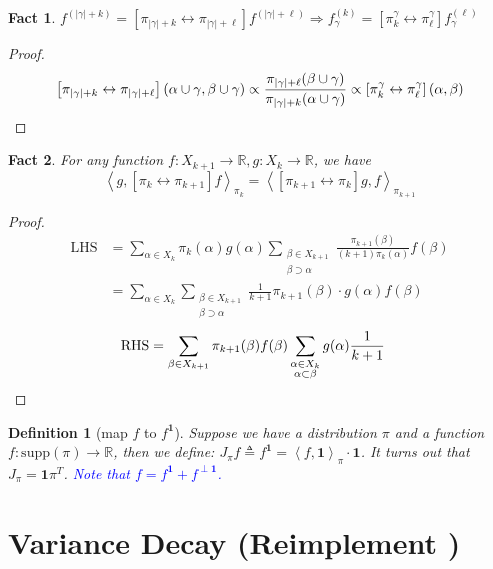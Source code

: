 \documentclass{article}
\newtheorem{define}{Definition}[section]
\newtheorem{fact}{Fact}[section]
\def\Op#1#2{\left[#1 \leftrightarrow #2\right]}
\def\<{\left\langle}
\def\>{\right\rangle}
\begin{document}
\begin{fact}\label{fact:f-consistent}
  $f^{(|\gamma|+k)} = \Op{\pi_{|\gamma|+k}}{\pi_{|\gamma|+\ell}} f^{(|\gamma| + \ell)} \Rightarrow f^{(k)}_\gamma = \Op{\pi^\gamma_k}{\pi^\gamma_\ell} f^{(\ell)}_\gamma$
\end{fact}
\begin{proof}
  \[\Op{\pi_{|\gamma| + k}}{\pi_{|\gamma| + \ell}}(\alpha\cup\gamma, \beta\cup\gamma) \propto \frac{\pi_{|\gamma|+\ell}(\beta\cup\gamma)}{\pi_{|\gamma|+k}(\alpha\cup\gamma)} \propto \Op{\pi_k^\gamma}{\pi_\ell^\gamma}(\alpha, \beta)\qedhere\]
\end{proof}

\begin{fact}
  For any function $f: X_{k+1}\to\mathbb{R}, g: X_k \to \mathbb{R}$, we have
  \[\<g, \Op{\pi_k}{\pi_{k+1}} f\>_{\pi_k} = \<\Op{\pi_{k+1}}{\pi_k} g, f\>_{\pi_{k+1}}\]
\end{fact}
\begin{proof}
  \begin{align*}
    \mathrm{LHS} &= \sum_{\alpha\in X_k} \pi_k(\alpha) g(\alpha) \sum_{\substack{\beta\in X_{k+1} \\ \beta \supset \alpha}} \frac{\pi_{k+1}(\beta)}{(k+1)\pi_k(\alpha)} f(\beta) \\
    &= \sum_{\alpha\in X_k}\sum_{\substack{\beta\in X_{k+1}\\\beta\supset\alpha}} \frac{1}{k+1} \pi_{k+1}(\beta) \cdot g(\alpha) f(\beta)
  \end{align*}
  \begin{align*}
    \mathrm{RHS} &= \sum_{\beta\in X_{k+1}} \pi_{k+1}(\beta) f(\beta) \sum_{\substack{\alpha \in X_k \\ \alpha \subset \beta}} g(\alpha) \frac{1}{k+1} \qedhere
  \end{align*}
\end{proof}

\begin{define}[map $f$ to $f^{\mathbf{1}}$]
  Suppose we have a distribution $\pi$ and a function $f: \mathrm{supp}(\pi) \to \mathbb{R}$, then we define:
  $J_\pi f \triangleq f^{\mathbf{1}} = \<f, \mathbf{1}\>_\pi \cdot \mathbf{1}$. It turns out that $J_\pi = \mathbf{1}\pi^T$. \textcolor{blue}{Note that $f = f^{\mathbf{1}} + f^{\perp \mathbf{1}}$.}
\end{define}

\section{Variance Decay (Reimplement \cite{alev2020improved})}
\end{document}
